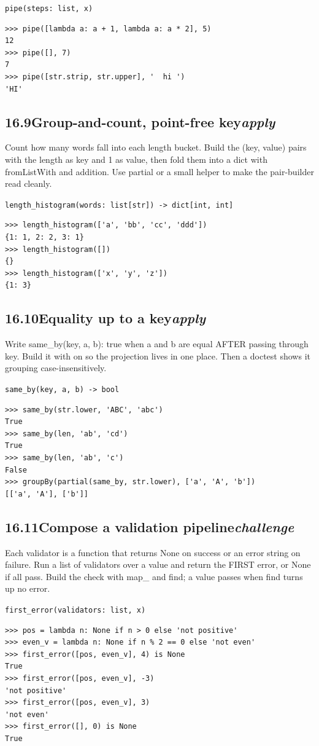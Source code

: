 \documentclass[10pt,letterpaper]{book}
\begin{document}
\noindent\texttt{pipe(steps: list, x)}
\begin{lstlisting}[style=ex]
>>> pipe([lambda a: a + 1, lambda a: a * 2], 5)
12
>>> pipe([], 7)
7
>>> pipe([str.strip, str.upper], '  hi ')
'HI'
\end{lstlisting}
\subsection*{16.9\quad Group-and-count, point-free key\hfill\textnormal{\textit{apply}}}
Count how many words fall into each length bucket. Build the (key, value) pairs with the length as key and 1 as value, then fold them into a dict with fromListWith and addition. Use partial or a small helper to make the pair-builder read cleanly.

\noindent\texttt{length\_histogram(words: list[str]) -> dict[int, int]}
\begin{lstlisting}[style=ex]
>>> length_histogram(['a', 'bb', 'cc', 'ddd'])
{1: 1, 2: 2, 3: 1}
>>> length_histogram([])
{}
>>> length_histogram(['x', 'y', 'z'])
{1: 3}
\end{lstlisting}
\subsection*{16.10\quad Equality up to a key\hfill\textnormal{\textit{apply}}}
Write same\_by(key, a, b): true when a and b are equal AFTER passing through key. Build it with on so the projection lives in one place. Then a doctest shows it grouping case-insensitively.

\noindent\texttt{same\_by(key, a, b) -> bool}
\begin{lstlisting}[style=ex]
>>> same_by(str.lower, 'ABC', 'abc')
True
>>> same_by(len, 'ab', 'cd')
True
>>> same_by(len, 'ab', 'c')
False
>>> groupBy(partial(same_by, str.lower), ['a', 'A', 'b'])
[['a', 'A'], ['b']]
\end{lstlisting}
\subsection*{16.11\quad Compose a validation pipeline\hfill\textnormal{\textit{challenge}}}
Each validator is a function that returns None on success or an error string on failure. Run a list of validators over a value and return the FIRST error, or None if all pass. Build the check with map\_ and find; a value passes when find turns up no error.

\noindent\texttt{first\_error(validators: list, x)}
\begin{lstlisting}[style=ex]
>>> pos = lambda n: None if n > 0 else 'not positive'
>>> even_v = lambda n: None if n % 2 == 0 else 'not even'
>>> first_error([pos, even_v], 4) is None
True
>>> first_error([pos, even_v], -3)
'not positive'
>>> first_error([pos, even_v], 3)
'not even'
>>> first_error([], 0) is None
True
\end{lstlisting}
\end{document}
